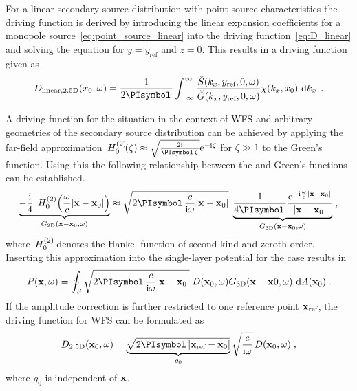 For a linear secondary source distribution with point source characteristics the
\twohalfD driving function is derived by introducing the
linear expansion coefficients for a monopole
source~\eqref{eq:point_source_linear} into the driving
function~\eqref{eq:D_linear} and solving the equation for $y = y_\text{ref}$ and
$z = 0$. This results in a \twohalfD driving function given
as\autocite[][(3.77)]{Ahrens2012}
%
\begin{equation}
    D_{\text{linear},\twohalfD}(x_0,\omega) = \frac{1}{2\PI} \int_{-\infty}^\infty
    \frac{\breve{S}(k_x,y_\text{ref},0,\omega)}
    {\breve{G}(k_x,y_\text{ref},0,\omega)} \chi(k_x,x_0) \, \D{k_x} \qp
    \label{eq:D_linear_25D}
\end{equation}
%

A driving function for the \twohalfD situation in the context of \ac{WFS}
and arbitrary \twoD geometries of the secondary source distribution
can be achieved by applying the
far-field approximation\autocite[][(4.23)]{Williams1999}
$\H{0}{2}(\zeta) \approx \sqrt{\frac{2\I}{\PI \zeta}}
\E^{-\I\zeta}$ for $\zeta \gg 1$ to the \twoD Green's function.
Using this the
following relationship between the \twoD and \threeD
Green's functions can be established.
%
\begin{multline} 
    \underbrace{
    -\frac{\I}{4} \;\H{0}{2}\left(\omegac |\x-\x_0|\right)
    }_{G_\twoD(\x-\x_0,\omega)}
    \approx
    \sqrt{2\PI \frac{c}{\I\omega} |\x-\x_0|} \;
    \underbrace{
        \frac{1}{4 \PI} \frac{\E^{-\I\omegac|\x-\x_0|}}{|\x-\x_0|}
    }_{G_\threeD(\x-\x_0,\omega)} \qc
\label{eq:25D_approximation}
\end{multline}
%
where $\,H_{0}^{(2)}\!$ denotes the Hankel function of second kind and zeroth
order.
Inserting this approximation into the single-layer potential for the \twoD
case results in
%
\begin{equation}
    P(\x,\omega) = \oint_S \sqrt{2\PI \frac{c}{\I\omega} |\x-\x_0|} \;
    D(\x_0,\omega) G_\threeD(\x-\x0,\omega) \, \D A(\x_0) \qp
    \label{eq:single_layer_potential_25D}
\end{equation}
%
If the amplitude correction is further restricted to one reference point
$\mathbf{x}_\text{ref}$, the \twohalfD driving function for \ac{WFS} can be formulated
as
%
\begin{equation}
    D_\twohalfD(\x_0,\omega) = \underbrace{\sqrt{2\PI |\x_\text{ref}-\x_0|}}_{g_0}
    \sqrt{\frac{c}{\I\omega}} \,
    D(\x_0,\omega) \qc
    \label{eq:D25D_wfs}
\end{equation}
%
where $g_0$ is independent of $\mathbf{x}$.

